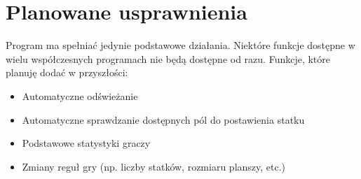 \documentclass[a4paper]{article}
\begin{document}
\section{Planowane usprawnienia}
Program ma spełniać jedynie podstawowe działania. Niektóre funkcje dostępne w wielu współczesnych programach nie będą dostępne od razu.
Funkcje, które planuję dodać w przyszłości:
\begin{itemize}
	\item Automatyczne odświeżanie 
	\item Automatyczne sprawdzanie dostępnych pól do postawienia statku
	\item Podstawowe statystyki graczy
	\item Zmiany reguł gry (np. liczby statków, rozmiaru planszy, etc.)
\end{itemize}
\end{document}
